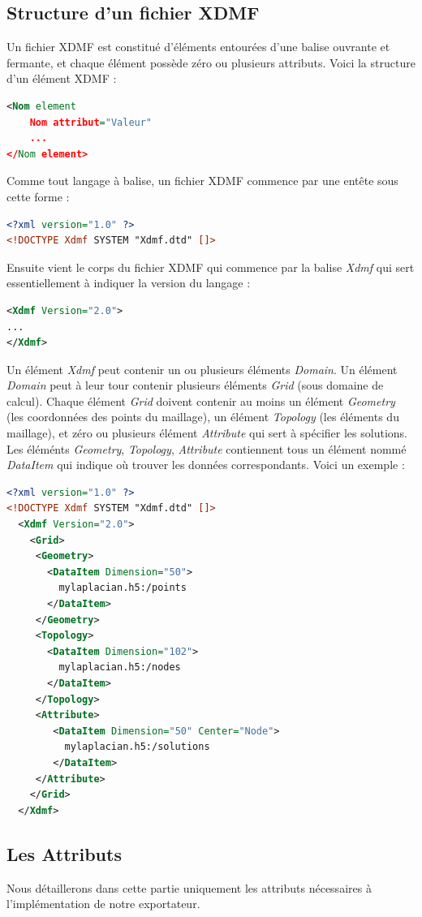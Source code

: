 \documentclass[12pt]{article}
\begin{document}
\subsection {Structure d'un fichier XDMF}

Un fichier XDMF est constitué d'éléments entourées d'une balise ouvrante et fermante, et chaque élément possède zéro ou plusieurs attributs.\newline
Voici la structure d'un élément XDMF :
\begin{lstlisting}[language=XML]
<Nom element
    Nom attribut="Valeur"
    ...
</Nom element>
\end{lstlisting}
Comme tout langage à balise, un fichier XDMF commence par une entête sous cette forme :
\begin{lstlisting}[language=XML]
<?xml version="1.0" ?>
<!DOCTYPE Xdmf SYSTEM "Xdmf.dtd" []>
\end{lstlisting}
Ensuite vient le corps du fichier XDMF qui commence par la balise \emph{Xdmf} qui sert essentiellement à indiquer la version du langage :
\begin{lstlisting}[language=XML]
<Xdmf Version="2.0">
...
</Xdmf>
\end{lstlisting}
Un élément \emph{Xdmf} peut contenir un ou plusieurs éléments \emph{Domain}. Un élément \emph{Domain} peut à leur tour contenir plusieurs éléments \emph{Grid} (sous domaine de calcul). Chaque élément \emph{Grid} doivent contenir au moins un élément \emph{Geometry} (les coordonnées des points du maillage), un élément \emph{Topology} (les éléments du maillage), et zéro ou plusieurs élément \emph{Attribute} qui sert à spécifier les solutions.\newline
Les éléménts \emph{Geometry}, \emph{Topology}, \emph{Attribute} contiennent tous un élément nommé \emph{DataItem} qui indique où trouver les données correspondants.\newline
Voici un exemple : 
\begin{lstlisting}[language=XML]
<?xml version="1.0" ?>
<!DOCTYPE Xdmf SYSTEM "Xdmf.dtd" []>
  <Xdmf Version="2.0">
    <Grid>
     <Geometry>
       <DataItem Dimension="50">
         mylaplacian.h5:/points
       </DataItem>
     </Geometry>
     <Topology>
       <DataItem Dimension="102">
         mylaplacian.h5:/nodes
       </DataItem>
     </Topology>
     <Attribute>
        <DataItem Dimension="50" Center="Node">
          mylaplacian.h5:/solutions
        </DataItem>
     </Attribute>
    </Grid>
  </Xdmf>
\end{lstlisting}
\subsection {Les Attributs}
Nous détaillerons dans cette partie uniquement les attributs nécessaires à l'implémentation de notre exportateur.
\end{document}

